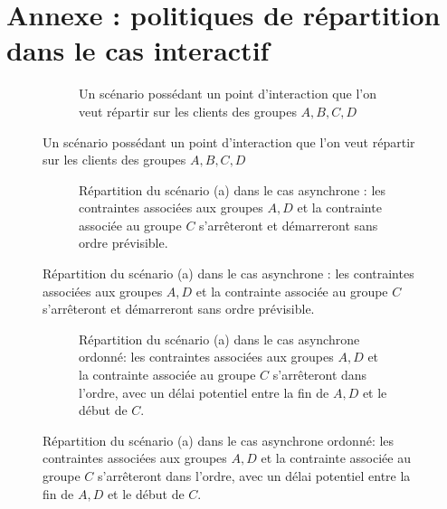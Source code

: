 \documentclass{article}
\newcommand\trigger{point d'interaction\xspace}
\begin{document}
\printbibliography 

\newpage

\section*{Annexe : politiques de répartition dans le cas interactif}

\begin{figure}[h]
	\centering
	\begin{subfigure}{.5\linewidth}
		\begin{tikzpicture}
		
		\end{tikzpicture}
		\caption{Un scénario possédant un \trigger que l'on veut répartir sur les clients des groupes $A,B,C,D$}
	\end{subfigure}
\end{figure}

\begin{figure}[h]
	\centering
	\ContinuedFloat
	\begin{subfigure}{.5\linewidth}
		\caption{Répartition du scénario (a) dans le cas asynchrone : les contraintes associées aux groupes $A,D$ et la contrainte associée au groupe $C$ s'arrêteront et démarreront sans ordre prévisible.}
	\end{subfigure}
\end{figure}


\begin{figure}[h]
	\centering
	\ContinuedFloat
	\begin{subfigure}{.5\linewidth}
		\caption{Répartition du scénario (a) dans le cas asynchrone ordonné: les contraintes associées aux groupes $A,D$ et la contrainte associée au groupe $C$ s'arrêteront dans l'ordre, avec un délai potentiel entre la fin de $A,D$ et le début de $C$.}
	\end{subfigure}
	
\end{figure}
\end{document}
